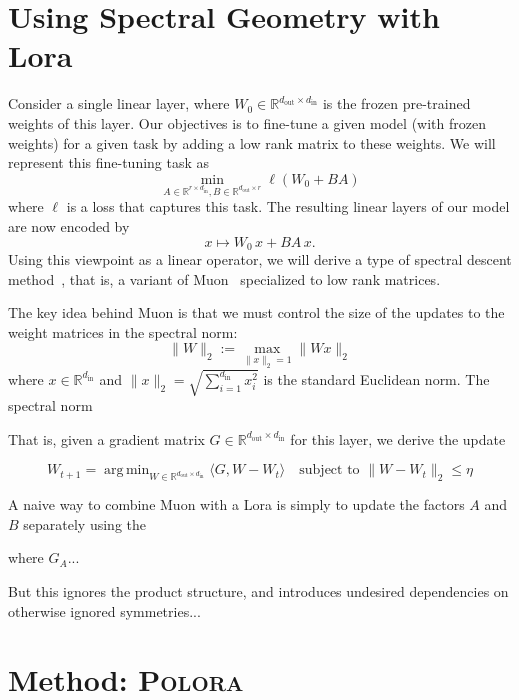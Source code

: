 \documentclass[11pt]{article}
\newcommand{\R}{\mathbb{R}}
\DeclareMathOperator*{\argmin}{arg\,min}
\newcommand{\methodname}{\textsc{Polora}\xspace}
\theoremstyle{plain}
\theoremstyle{definition}
\theoremstyle{remark}
\begin{document}
\section{Using Spectral Geometry with Lora}
\label{sec:setup}


Consider a single linear layer, where $W_0 \in \R^{d_{\mathrm{out}} \times d_{\mathrm{in}}}$ is the frozen pre-trained weights of this layer. Our objectives is to fine-tune a given model (with frozen weights) for a given task by adding a low rank matrix to these weights. We will represent this fine-tuning task as
\begin{equation}
    \min_{A\in\R^{r\times d_{\mathrm{in}}},
B\in\R^{d_{\mathrm{out}}\times r}} \ell(W_0 + BA)
\end{equation}
where $\ell$ is a loss that captures this task.  The resulting linear layers of our model are now encoded by
\[ x \mapsto W_0 \,x + BA \,x.\]
Using this viewpoint as a linear operator, we will derive a type of spectral descent method~\cite{}, that is, a variant of Muon~\cite{} specialized to low rank matrices.

The key idea behind Muon is that we must control the size of the updates to the weight matrices in the spectral norm:
\[ \|W\|_2 := \max_{\|x\|_2 =1} \|W x \|_2\]
where $x\in \R^{d_{\mathrm{in}}}$ and $\|x\|_2 = \sqrt{\sum_{i=1}^{d_{\mathrm{in}}} x_i^2}$ is the standard Euclidean norm.
The spectral norm 

That is, given a gradient matrix $G \in \R^{d_{\mathrm{out}} \times d_{\mathrm{in}}}$ for this layer, we derive the update

$$W_{t+1} = \argmin_{W\in  \R^{d_{\mathrm{out}} \times d_{\mathrm{in}}}} \langle G,W-W_t\rangle \quad \mbox{subject to } \| W-W_t\|_2 \leq \eta$$



A naive way to combine Muon with a Lora is simply to update the factors $A$ and $B$ separately using the 

where $G_A...$ 


But this ignores the product structure, and introduces undesired dependencies on otherwise ignored symmetries...




\section{Method: \methodname}
\label{sec:method}
\end{document}
